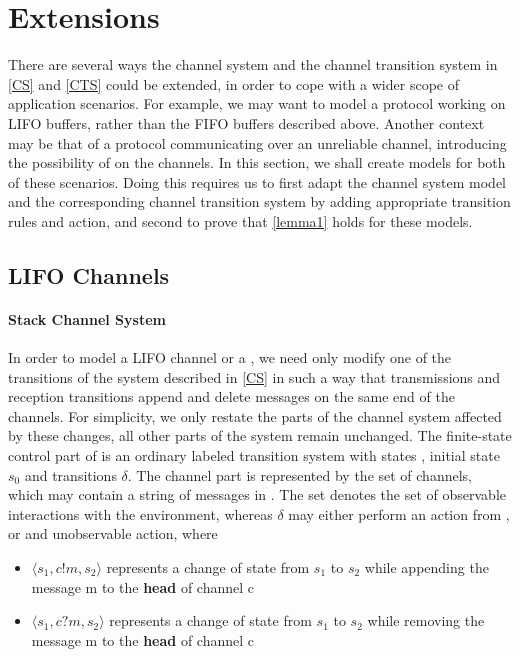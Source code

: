 \section{Extensions}
\label{extensions}
There are several ways the channel system and the channel transition system in \ref{CS} and \ref{CTS} could be extended, in order to cope with a wider scope of application scenarios. For example, we may want to model a protocol working on LIFO buffers, rather than the FIFO buffers described above. Another context may be that of a protocol communicating over an unreliable channel, introducing the possibility of  on the channels. In this section, we shall create models for both of these scenarios. Doing this requires us to first adapt the channel system model and the corresponding channel transition system by adding appropriate transition rules and action, and second to prove that \ref{lemma1} holds for these models.

\subsection{LIFO Channels}
\paragraph{Stack Channel System}
\label{StackCS}
In order to model a LIFO channel or a , we need only modify one of the transitions of the system described in \ref{CS} in such a way that transmissions and reception transitions append and delete messages on the same end of the channels. For simplicity, we only restate the parts of the channel system affected by these changes, all other parts of the system remain unchanged. The finite-state control part of  is an ordinary labeled transition system with states , initial state $s_0$ and transitions $\delta$. The channel part is represented by the set  of channels, which may contain a string of messages in . The set  denotes the set of observable interactions with the environment, whereas $\delta$ may either perform an action from , or and unobservable action, where

\begin{itemize}
\item[]
$\langle s_1, c!m, s_2\rangle$ represents a change of state from $s_1$ to $s_2$ while appending the message m to the \textbf{head} of channel c
\item[]
$\langle s_1, c?m, s_2\rangle$ represents a change of state from $s_1$ to $s_2$ while removing the message m to the \textbf{head} of channel c
\end{itemize}

